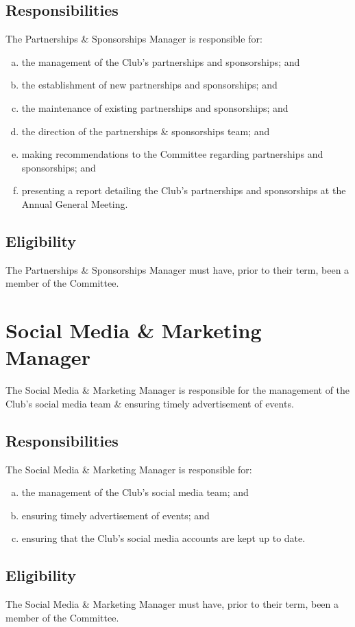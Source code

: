 \documentclass[11pt]{report}
\begin{document}
\subsection{Responsibilities}
The Partnerships \& Sponsorships Manager is responsible for:
\begin{enumerate}[(a)]
    \item the management of the Club's partnerships and sponsorships; and
    \item the establishment of new partnerships and sponsorships; and
    \item the maintenance of existing partnerships and sponsorships; and
    \item the direction of the partnerships \& sponsorships team; and
    \item making recommendations to the Committee regarding partnerships and sponsorships; and
    \item presenting a report detailing the Club's partnerships and sponsorships at the Annual General Meeting.
\end{enumerate}
\subsection{Eligibility}
The Partnerships \& Sponsorships Manager must have, prior to their term, been a member of the Committee.

\section{Social Media \& Marketing Manager}
The Social Media \& Marketing Manager is responsible for the management of the Club's social media team \& ensuring timely advertisement of events.
\subsection{Responsibilities}
The Social Media \& Marketing Manager is responsible for:
\begin{enumerate}[(a)]
    \item the management of the Club's social media team; and
    \item ensuring timely advertisement of events; and
    \item ensuring that the Club's social media accounts are kept up to date.
\end{enumerate}
\subsection{Eligibility}
The Social Media \& Marketing Manager must have, prior to their term, been a member of the Committee.
\end{document}
